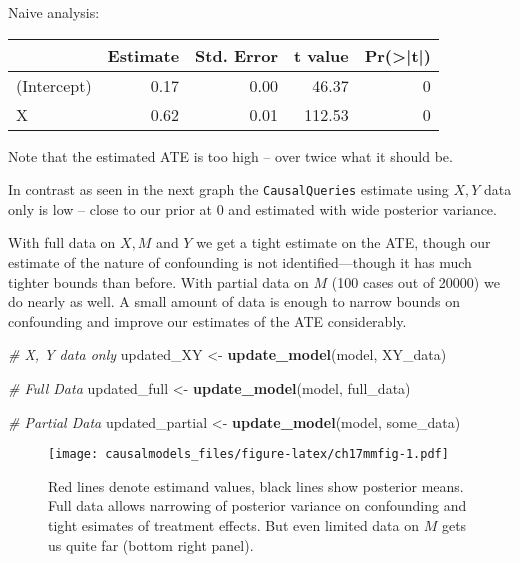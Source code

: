 \documentclass[
  12pt,
]{book}
\newenvironment{Shaded}{\begin{snugshade}}{\end{snugshade}}
\newcommand{\CommentTok}[1]{\textcolor[rgb]{0.56,0.35,0.01}{\textit{#1}}}
\newcommand{\DataTypeTok}[1]{\textcolor[rgb]{0.13,0.29,0.53}{#1}}
\newcommand{\DecValTok}[1]{\textcolor[rgb]{0.00,0.00,0.81}{#1}}
\newcommand{\KeywordTok}[1]{\textcolor[rgb]{0.13,0.29,0.53}{\textbf{#1}}}
\newcommand{\NormalTok}[1]{#1}
\newcommand{\OperatorTok}[1]{\textcolor[rgb]{0.81,0.36,0.00}{\textbf{#1}}}
\newcommand{\StringTok}[1]{\textcolor[rgb]{0.31,0.60,0.02}{#1}}
\begin{document}
Naive analysis:

\begin{Shaded}
\end{Shaded}

\begin{tabular}{l|r|r|r|r}
\hline
  & Estimate & Std. Error & t value & Pr(>|t|)\\
\hline
(Intercept) & 0.17 & 0.00 & 46.37 & 0\\
\hline
X & 0.62 & 0.01 & 112.53 & 0\\
\hline
\end{tabular}

Note that the estimated ATE is too high -- over twice what it should be.

In contrast as seen in the next graph the \texttt{CausalQueries} estimate using \(X,Y\) data only is low -- close to our prior at 0 and estimated with wide posterior variance.

With full data on \(X, M\) and \(Y\) we get a tight estimate on the ATE, though our estimate of the nature of confounding is not identified---though it has much tighter bounds than before. With partial data on \(M\) (100 cases out of 20000) we do nearly as well. A small amount of data is enough to narrow bounds on confounding and improve our estimates of the ATE considerably.

\begin{Shaded}
\begin{Highlighting}[]
\CommentTok{# X, Y data only}
\NormalTok{updated_XY      <-}\StringTok{ }\KeywordTok{update_model}\NormalTok{(model, XY_data)}

\CommentTok{# Full Data}
\NormalTok{updated_full    <-}\StringTok{ }\KeywordTok{update_model}\NormalTok{(model, full_data)}

\CommentTok{# Partial Data}
\NormalTok{updated_partial <-}\StringTok{ }\KeywordTok{update_model}\NormalTok{(model, some_data)}
\end{Highlighting}
\end{Shaded}

\begin{figure}
\centering
\texttt{[image: causalmodels\_files/figure-latex/ch17mmfig-1.pdf]}
\caption{\label{fig:ch17mmfig}Red lines denote estimand values, black lines show posterior means. Full data allows narrowing of posterior variance on confounding and tight esimates of treatment effects. But even limited data on \(M\) gets us quite far (bottom right panel).}
\end{figure}
\end{document}

